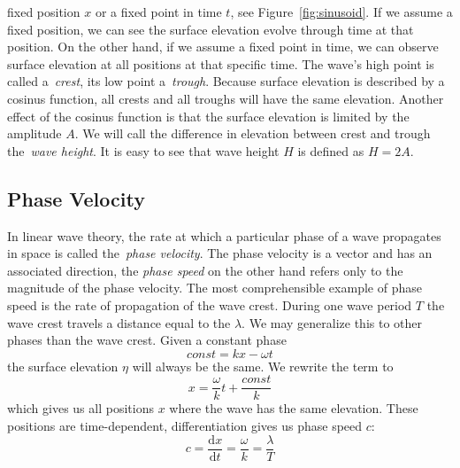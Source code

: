 fixed position $x$ or a fixed point in time $t$, see Figure~\ref{fig:sinusoid}.
If we assume a fixed position, we can see the surface elevation evolve through
time at that position. On the other hand, if we assume a fixed point in time, we
can observe surface elevation at all positions at that specific time. The wave's
high point is called a~\emph{crest}, its low point a~\emph{trough}. Because
surface elevation is described by a cosinus function, all crests and all troughs
will have the same elevation. Another effect of the cosinus function is that the
surface elevation is limited by the amplitude $A$. We will call the difference
in elevation between crest and trough the~\emph{wave height}. It is easy to see
that wave height $H$ is defined as $H=2A$.
%
\subsection{Phase Velocity}
\label{sec:phase_velocity}
In linear wave theory, the rate at which a particular phase of a wave propagates in space is called
the~\emph{phase velocity}. The phase velocity is a vector and has an associated direction,
the \emph{phase speed} on the other hand refers only to the magnitude of the phase velocity.
The most comprehensible example of phase speed is the rate of propagation of the wave crest.
During one wave period $T$ the wave crest travels a distance equal to the \wavelength $\lambda$.
We may generalize this to other phases than the wave crest. Given a constant phase
\begin{equation*}
  const = kx - \omega t
\end{equation*}
the surface elevation $\eta$ will always be the same. We rewrite the term to
\begin{equation*}
  x = \frac{\omega}{k}t + \frac{const}{k}
\end{equation*}
which gives us all positions $x$ where the wave has the same elevation. These
positions are time-dependent, differentiation gives us phase speed $c$:
\begin{equation*}
  c = \frac{\mathrm dx}{\mathrm dt} = \frac{\omega}{k} = \frac{\lambda}{T}
\end{equation*}

